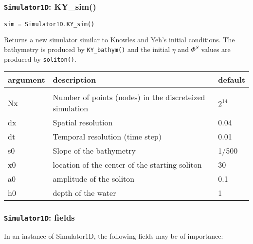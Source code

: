 \documentclass[10pt,a4paper]{article}
\newenvironment{optarglist}
    {\begin{center}
    \begin{tabular}{l|p{10cm}|l}
    argument & description & default\\
    \hline\\
    }
    { 
    \end{tabular} 
    \end{center}
    }
\begin{document}
\subsubsection{\texttt{Simulator1D}: KY\_sim()}
\texttt{sim = Simulator1D.KY\_sim()}

Returns a new simulator similar to Knowles and Yeh's
        initial conditions. The bathymetry is produced by \texttt{KY\_bathym()} and the initial $\eta$ and $\Phi^S$ values are produced by \texttt{soliton()}.

\begin{optarglist}
        Nx       & Number of points (nodes) in the discreteized simulation & $2^{14}$\\\hline
        dx        & Spatial resolution & 0.04 \\\hline
        dt        & Temporal resolution (time step) & 0.01 \\\hline
        s0        & Slope of the bathymetry & 1/500 \\\hline
        x0        & location of the center of the starting soliton & 30 \\\hline
        a0        & amplitude of the soliton & 0.1 \\\hline 
        h0        & depth of the water & 1 \\\hline
\end{optarglist}




\subsubsection{\texttt{Simulator1D}: fields}
In an instance of Simulator1D, the following fields may be of importance:
\end{document}
